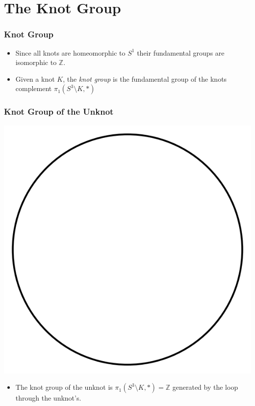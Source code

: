 \documentclass{beamer}
\begin{document}
\section{The Knot Group}

\begin{frame}
  \frametitle{Knot Group}
  \begin{itemize}
  \item Since all knots are homeomorphic to $S^1$ their
    fundamental groups are isomorphic to $\mathbb{Z}$.
  \item Given a knot $K$, the \textit{knot group} is
    the fundamental group of the knots complement  $\pi_1(S^3\setminus K,*)$
  \end{itemize}
\end{frame}

\begin{frame}
  \frametitle{Knot Group of the Unknot}
  \begin{center}
    \includegraphics[scale=.3]{unknot}
  \end{center}
  \begin{itemize}
  \item The knot group of the unknot is
    $\pi_1(S^3\setminus K,*)=\mathbb{Z}$ generated by the loop through the
    unknot's.
  \end{itemize}
\end{frame}
\end{document}
